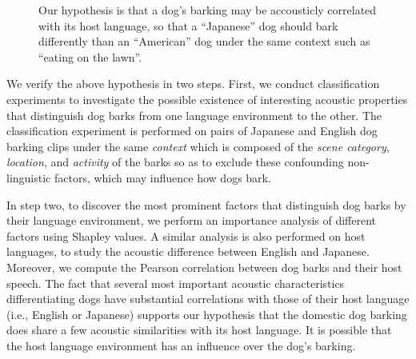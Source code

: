 \begin{figure}[th]
	\centering
	\caption{%
Our hypothesis is that a dog's barking 
may be accousticly correlated with its host language, 
so that a ``Japanese'' dog should bark differently than an ``American''
dog under the same context such as ``eating on the lawn''.}
\label{fig:intropic}
\end{figure}

We verify the above hypothesis in two steps. 
First, we conduct classification experiments to investigate the possible
existence of interesting acoustic properties that distinguish dog barks from one language environment to the other. The classification experiment is performed on pairs of Japanese and English dog barking clips under the same \textit{context} which is composed of the \textit{scene category}, \textit{location}, and \textit{activity} of the barks so as to exclude  
these confounding non-linguistic factors, which may influence how dogs bark. 

In step two, to discover the most prominent factors that distinguish dog barks by their language environment, we perform an importance analysis of different factors using Shapley values. A similar analysis is also performed on host languages, to study the acoustic difference between English and Japanese. Moreover, we compute the Pearson correlation between dog barks and their host speech. 
The fact that several most important acoustic characteristics differentiating dogs have 
substantial correlations with those of their host language (i.e., English or Japanese) supports 
our hypothesis that the domestic dog barking does share a few acoustic similarities with its 
host language. It is possible that the host language environment has an influence over 
the dog's barking. 

